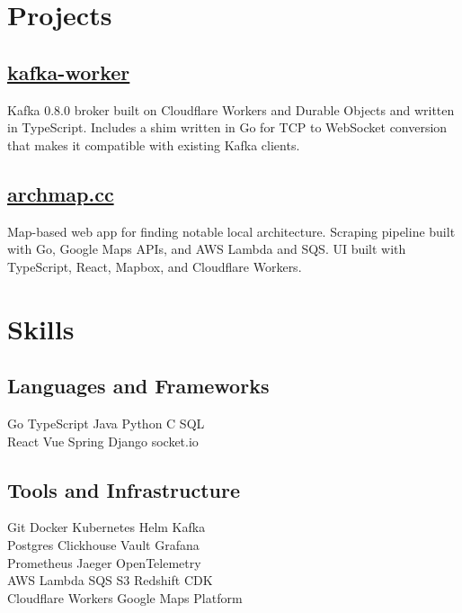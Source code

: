 \documentclass[]{deedy-resume}
\begin{document}
\begin{minipage}[t]{0.5\textwidth}
\section{Projects}
\subsection{\href{https://github.com/maxwellpeterson/kafka-worker}{kafka-worker}}
Kafka 0.8.0 broker built on Cloudflare Workers and Durable Objects and written in TypeScript. Includes a shim written in Go for TCP to WebSocket conversion that makes it compatible with existing Kafka clients.
\sectionsep
\subsection{\href{https://archmap.cc}{archmap.cc}}
Map-based web app for finding notable local architecture. Scraping pipeline built with Go, Google Maps APIs, and AWS Lambda and SQS. UI built with TypeScript, React, Mapbox, and Cloudflare Workers.
\end{minipage}\hfill\begin{minipage}[t]{0.45\textwidth}
\section{Skills}
\subsection{Languages and Frameworks}
Go \textbullet{} TypeScript \textbullet{} Java \textbullet{} Python \textbullet{} C \textbullet{} SQL \\
React \textbullet{} Vue \textbullet{} Spring \textbullet{} Django \textbullet{} socket.io
\sectionsep
\subsection{Tools and Infrastructure}
Git \textbullet{} Docker \textbullet{} Kubernetes \textbullet{} Helm \textbullet{} Kafka \\
Postgres \textbullet{} Clickhouse \textbullet{} Vault \textbullet{} Grafana \\
Prometheus \textbullet{} Jaeger \textbullet{} OpenTelemetry \\
AWS Lambda \textbullet{} SQS \textbullet{} S3 \textbullet{} Redshift \textbullet{} CDK \\
Cloudflare Workers \textbullet{} Google Maps Platform
\end{minipage}
\end{document}
